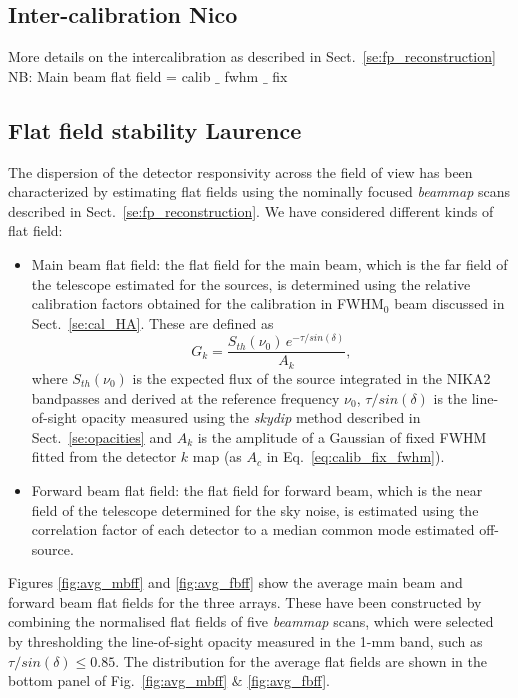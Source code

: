 
\subsection{Inter-calibration {\color{blue} Nico}}

{\color{blue} More details on the intercalibration as described in Sect.~\ref{se:fp_reconstruction}} \\

{\color{blue} NB: Main beam flat field = calib $\_$ fwhm $\_$ fix}


\subsection{Flat field stability {\color{blue} Laurence} }
  
The dispersion of the detector responsivity across the field of view has been characterized by estimating flat fields using the nominally focused \emph{beammap} scans described in Sect.~\ref{se:fp_reconstruction}. We have considered different kinds of flat field:
\begin{itemize}
\item Main beam flat field: the flat field for the main beam, which is the far field of the telescope estimated for the sources, is determined using the relative calibration factors obtained for the calibration in FWHM$_{0}$ beam discussed in Sect.~\ref{se:cal_HA}. These are defined as
  \begin{equation}
    G_k = \frac{S_{th}(\nu_0)\, e^{-\tau/sin(\delta)}}{A_k}, 
  \end{equation}
  where $S_{th}(\nu_0)$ is the expected flux of the source integrated in the NIKA2 bandpasses and derived at the reference frequency $\nu_0$, $\tau/sin(\delta)$ is the line-of-sight opacity measured using the \emph{skydip} method described in Sect.~\ref{se:opacities} and $A_k$ is the amplitude of a Gaussian of fixed FWHM fitted from the detector $k$ map (as $A_{c}$ in Eq.~\ref{eq:calib_fix_fwhm}).
\item Forward beam flat field: the flat field for forward beam, which is the near field of the telescope determined for the sky noise, is estimated using the correlation factor of each detector to a median common mode estimated off-source.
\end{itemize}

Figures \ref{fig:avg_mbff} and \ref{fig:avg_fbff} show the average main beam and forward beam flat fields for the three arrays. These have been constructed by combining the normalised flat fields of five \emph{beammap} scans, which were selected by thresholding the line-of-sight opacity measured in the 1-mm band, such as $\tau/sin(\delta) \leq 0.85$. The distribution for the average flat fields are shown in the bottom panel of Fig.~\ref{fig:avg_mbff} $\&$ \ref{fig:avg_fbff}.

